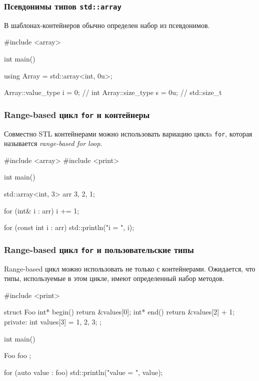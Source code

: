 \documentclass[compress, 8pt]{beamer}
\begin{document}
  \begin{frame}[fragile]

    \frametitle{Псевдонимы типов \texttt{std::array}}

    В шаблонах-контейнеров обычно определен набор из псевдонимов.

    \begin{mycppinplacelisting}
#include <array>

int main() {
    using Array = std::array<int, 0u>;

    Array::value_type i = 0; // int
    Array::size_type s = 0u; // std::size_t
}
    \end{mycppinplacelisting}

  \end{frame}

  \begin{frame}[fragile]

    \frametitle{Range-based цикл \texttt{for} и контейнеры}

    Совместно STL контейнерами можно использовать вариацию циклa \texttt{for},
    которая называется \textit{range-based for loop}\footnotemark{}.


    \begin{myinplacelisting}[minted language=cpp]
#include <array>
#include <print>

int main() {
    std::array<int, 3> arr {3, 2, 1};

    for (int& i : arr) {
        i += 1;
    }

    for (const int i : arr) {
        std::println("i = {}", i);
    }
}
    \end{myinplacelisting}

  \end{frame}

  \begin{frame}[fragile]

    \frametitle{Range-based цикл \texttt{for} и пользовательские типы}

    Range-based цикл можно использовать не только с контейнерами.
    Ожидается, что типы, используемые в этом цикле, имеют определенный
    набор методов.

    \begin{mycppinplacelisting}
#include <print>

struct Foo {
    int* begin() { return &values[0]; }
    int* end() { return &values[2] + 1; }
private:
    int values[3] = {1, 2, 3};
};

int main() {
    Foo foo {};

    for (auto value : foo) {
        std::println("value = {}", value);
    }
}
    \end{mycppinplacelisting}

  \end{frame}
\end{document}
